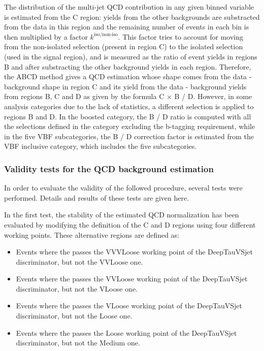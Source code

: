 \documentclass[../main.tex]{subfiles}
\begin{document}
The distribution of the multi-jet QCD contribution in any given binned variable is estimated from the C region: yields from the other backgrounds are substracted from the data in this region and the remaining number of events in each bin is then multiplied by a factor $k^{\text{iso/non-iso}}$. This factor tries to account for moving from the non-isolated selection (present in region C) to the isolated selection (used in the signal region), and is measured as the ratio of event yields in regions B and after substracting the other background yields in each region. Therefore, the ABCD method gives a QCD estimation whose shape comes from the data - background shape in region C and its yield from the data - background yields from regions B, C and D as given by the formula C $\times$ B / D. However, in some analysis categories due to the lack of statistics, a different selection is applied to regions B and D. In the boosted category, the B / D ratio is computed with all the selections defined in the category excluding the b-tagging requirement, while in the five VBF subcategories, the B / D correction factor is estimated from the VBF inclusive category, which includes the five subcategories.



\subsubsection{Validity tests for the QCD background estimation}

In order to evaluate the validity of the followed procedure, several tests were performed. Details and results of these tests are given here.

In the first test, the stability of the estimated QCD normalization has been evaluated by modifying the definition of the C and D regions using four different \deeptau{} working points. These alternative regions are defined as:
\begin{itemize}
\item Events where the \tauh{} passes the VVVLoose working point of the DeepTauVSjet discriminator, but not the VVLoose one.
\item Events where the \tauh{} passes the VVLoose working point of the DeepTauVSjet discriminator, but not the VLoose one.
\item Events where the \tauh{} passes the VLoose working point of the DeepTauVSjet discriminator, but not the Loose one.
\item Events where the \tauh{} passes the Loose working point of the DeepTauVSjet discriminator, but not the Medium one.
\end{itemize}
\end{document}
